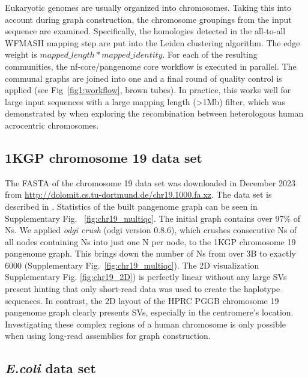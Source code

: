 \documentclass{bioinfo}
\theoremstyle{definition}
\begin{document}
	Eukaryotic genomes are usually organized into chromosomes. 
	Taking this into account during graph construction, the chromosome groupings from the input sequence are examined. 
	Specifically, the homologies detected in the all-to-all WFMASH mapping step are put into the Leiden \citep{Traag2019} clustering algorithm. 
	The edge weight is $mapped\_length * mapped\_identity$. 
	For each of the resulting communities, the nf-core/pangenome core workflow is executed in parallel. 
	The communal graphs are joined into one and a final round of quality control is applied (see Fig~\ref{fig1:workflow}, brown tubes). 
	In practice, this works well for large input sequences with a large mapping length (>1Mb) filter, which was demonstrated by \cite{Guarracino2023} when exploring the recombination between heterologous human acrocentric chromosomes.
	
	\subsection{1KGP chromosome 19 data set}
	
	The FASTA of the chromosome 19 data set was downloaded in December 2023 from \href{http://dolomit.cs.tu-dortmund.de/chr19.1000.fa.xz}{http://dolomit.cs.tu-dortmund.de/chr19.1000.fa.xz}. The data set is described in \citep{Kuhnle2020}. Statistics of the built pangenome graph can be seen in Supplementary Fig. ~\ref{fig:chr19_multiqc}. The initial graph contains over 97\% of Ns. We applied \textit{odgi crush} (odgi version 0.8.6), which crushes consecutive Ns of all nodes containing Ns into just one N per node, to the 1KGP chromosome 19 pangenome graph. This brings down the number of Ns from over 3B to exactly 6000 (Supplementary Fig.~\ref{fig:chr19_multiqc}). 
	The 2D visualization Supplementary Fig. \ref{fig:chr19_2D}) is perfectly linear without any large SVs present hinting that only short-read data was used to create the haplotype sequences.
	In contrast, the 2D layout of the HPRC PGGB chromosome 19 pangenome graph \citep{Heumos2023} clearly presents SVs, especially in the centromere's location. Investigating these complex regions of a human chromosome is only possible when using long-read assemblies for graph construction.
	
	
	
	
	\subsection{\textit{E.coli} data set}
	
\end{document}
